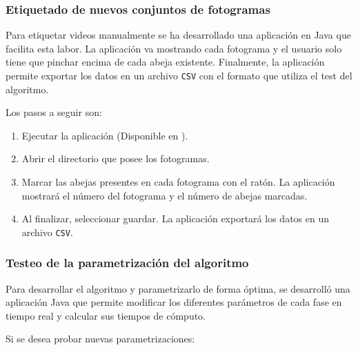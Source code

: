 
\subsubsection{Etiquetado de nuevos conjuntos de
fotogramas}\label{etiquetado-de-nuevos-conjuntos-de-fotogramas}

Para etiquetar videos manualmente se ha desarrollado una aplicación en
Java que facilita esta labor. La aplicación va mostrando cada fotograma
y el usuario solo tiene que pinchar encima de cada abeja existente.
Finalmente, la aplicación permite exportar los datos en un archivo
\texttt{CSV} con el formato que utiliza el test del algoritmo.

Los pasos a seguir son:

\begin{enumerate}
\def\labelenumi{\arabic{enumi}.}
\tightlist
\item
  Ejecutar la aplicación (Disponible en \citep{github:extraapps}).
\item
  Abrir el directorio que posee los fotogramas.
\item
  Marcar las abejas presentes en cada fotograma con el ratón. La
  aplicación mostrará el número del fotograma y el número de abejas
  marcadas.
\item
  Al finalizar, seleccionar guardar. La aplicación exportará los datos
  en un archivo \texttt{CSV}.
\end{enumerate}


\subsubsection{Testeo de la parametrización del
algoritmo}\label{testeo-de-la-parametrizacion-del-algoritmo}

Para desarrollar el algoritmo y parametrizarlo de forma óptima, se
desarrolló una aplicación Java que permite modificar los diferentes
parámetros de cada fase en tiempo real y calcular sus tiempos de
cómputo.

Si se desea probar nuevas parametrizaciones:

